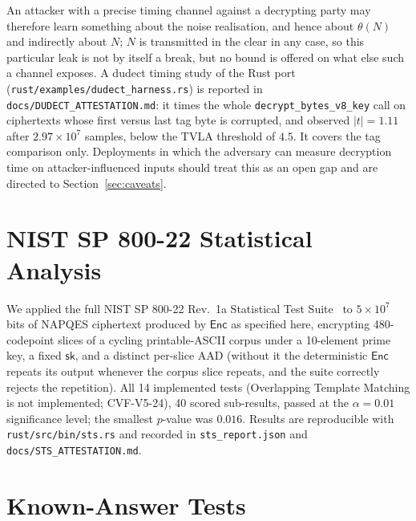 \documentclass[11pt,a4paper]{article}
\begin{document}
An attacker with a precise timing channel against a decrypting party may
therefore learn something about the noise realisation, and hence about
$\theta(N)$ and indirectly about $N$; $N$ is transmitted in the clear in
any case, so this particular leak is not by itself a break, but no bound is
offered on what else such a channel exposes. A dudect timing study of the
Rust port (\texttt{rust/examples/dudect\_harness.rs}) is reported in
\texttt{docs/DUDECT\_ATTESTATION.md}: it times the whole
\texttt{decrypt\_bytes\_v8\_key} call on ciphertexts whose first versus last
tag byte is corrupted, and observed $|t|=1.11$ after $2.97\times10^7$
samples, below the TVLA threshold of $4.5$. It covers the tag comparison only. Deployments in which the adversary can measure
decryption time on attacker-influenced inputs should treat this as an open
gap and are directed to Section~\ref{sec:caveats}.

\section{NIST SP 800-22 Statistical Analysis}
\label{sec:sts}

We applied the full NIST SP 800-22 Rev.\ 1a Statistical Test
Suite~\cite{sp800-22} to $5\times10^7$ bits of NAPQES ciphertext produced by
$\mathsf{Enc}$ as specified here, encrypting 480-codepoint slices of a
cycling printable-ASCII corpus under a 10-element prime key, a fixed
$\mathsf{sk}$, and a distinct per-slice AAD (without it the deterministic
$\mathsf{Enc}$ repeats its output whenever the corpus slice repeats, and the
suite correctly rejects the repetition). All 14 implemented tests (Overlapping Template Matching is not
implemented; CVF-V5-24), 40 scored
sub-results, passed at the $\alpha=0.01$ significance level; the smallest
$p$-value was $0.016$. Results are reproducible with
\texttt{rust/src/bin/sts.rs} and recorded in \texttt{sts\_report.json} and
\texttt{docs/STS\_ATTESTATION.md}.

\section{Known-Answer Tests}
\label{sec:kats}
\end{document}
